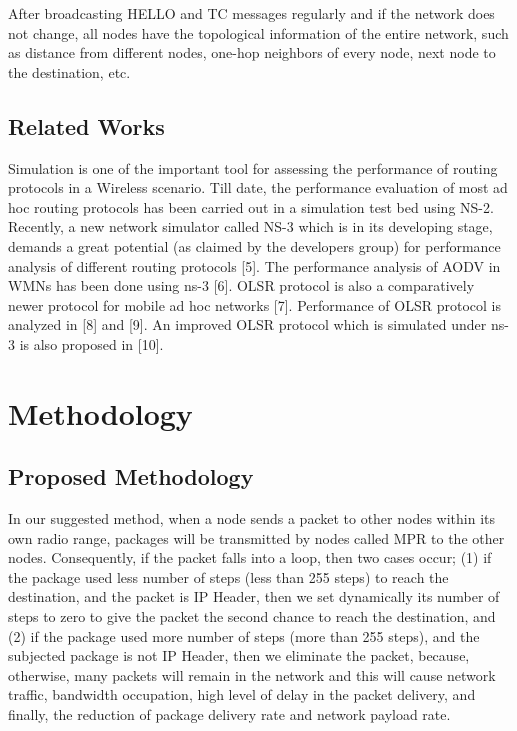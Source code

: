 \documentclass[12pt,a4paper]{report}
\begin{document}
After broadcasting HELLO and TC messages regularly and if the network does
not change, all nodes have the topological information of the entire network, such
as distance from different nodes, one-hop neighbors of every node, next node to the
destination, etc.
\section{Related Works}
Simulation is one of the important tool for assessing the
performance of routing protocols in a Wireless scenario. Till
date, the performance evaluation of most ad hoc routing
protocols has been carried out in a simulation test bed using
NS-2. Recently, a new network simulator called NS-3 which is in its developing stage, demands a great
potential (as claimed by the developers group) for performance analysis of different routing protocols [5].
The performance analysis of AODV in WMNs has been done using ns-3 [6]. OLSR protocol is also a comparatively newer protocol for mobile ad hoc networks [7]. Performance of OLSR protocol is analyzed in [8] and [9]. An improved OLSR protocol which is simulated under ns-3 is also proposed in [10]. 

\chapter{Methodology}

\section{Proposed Methodology}
In our suggested method, when a node sends a
packet to other nodes within its own radio range,
packages will be transmitted by nodes called MPR to
the other nodes. Consequently, if the packet falls into
a loop, then two cases occur; (1) if the package used
less number of steps (less than 255 steps) to reach the
destination, and the packet is IP Header, then we set
dynamically its number of steps to zero to give the
packet the second chance to reach the destination, and
(2) if the package used more number of steps (more
than 255 steps), and the subjected package is not IP
Header, then we eliminate the packet, because,
otherwise, many packets will remain in the network
and this will cause network traffic, bandwidth
occupation, high level of delay in the packet delivery,
and finally, the reduction of package delivery rate and
network payload rate.
\end{document}
